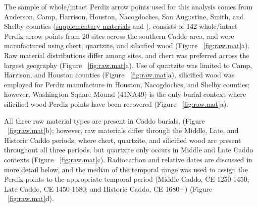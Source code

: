 \documentclass[review]{elsarticle}
\begin{document}
The sample of whole/intact Perdiz arrow points used for this analysis comes from Anderson, Camp, Harrison, Houston, Nacogdoches, San Augustine, Smith, and Shelby counties (\href{https://aksel-blaise.github.io/perdiz/spatial.html}{supplementary materials} and \citealt{RN8980}), consists of 142 whole/intact Perdiz arrow points from 20 sites across the southern Caddo area, and were manufactured using chert, quartzite, and silicified wood (Figure ~\ref{fig:raw.mat}a). Raw material distributions differ among sites, and chert was preferred across the largest geography (Figure ~\ref{fig:raw.mat}a). Use of quartzite was limited to Camp, Harrison, and Houston counties (Figure ~\ref{fig:raw.mat}a), silicified wood was employed for Perdiz manufacture in Houston, Nacogdoches, and Shelby counties; however, Washington Square Mound (41NA49) is the only burial context where silicified wood Perdiz points have been recovered (Figure ~\ref{fig:raw.mat}a).

All three raw material types are present in Caddo burials, (Figure ~\ref{fig:raw.mat}b); however, raw materials differ through the Middle, Late, and Historic Caddo periods, where chert, quartzite, and silicified wood are present throughout all three periods, but quartzite only occurs in Middle and Late Caddo contexts (Figure ~\ref{fig:raw.mat}c). Radiocarbon and relative dates are discussed in more detail below, and the median of the temporal range was used to assign the Perdiz points to the appropriate temporal period (Middle Caddo, CE 1250-1450; Late Caddo, CE 1450-1680; and Historic Caddo, CE 1680+) (Figure ~\ref{fig:raw.mat}d).
\end{document}
